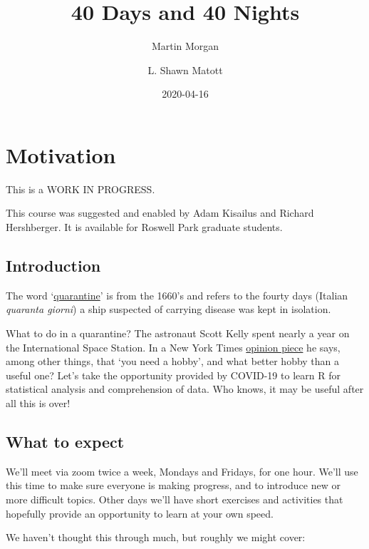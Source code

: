 \documentclass[
]{book}
\title{40 Days and 40 Nights}
\author{Martin Morgan \and L. Shawn Matott}
\date{2020-04-16}
\begin{document}
\maketitle

{
\setcounter{tocdepth}{1}
\tableofcontents
}
\hypertarget{motivation}{%
\chapter*{Motivation}\label{motivation}}

This is a WORK IN PROGRESS.

This course was suggested and enabled by Adam Kisailus and Richard Hershberger. It is available for Roswell Park graduate students.

\hypertarget{introduction}{%
\section*{Introduction}\label{introduction}}

The word `\href{https://www.etymonline.com/word/quarantine}{quarantine}' is from the 1660's and refers to the fourty days (Italian \emph{quaranta giorni}) a ship suspected of carrying disease was kept in isolation.

What to do in a quarantine? The astronaut Scott Kelly spent nearly a year on the International Space Station. In a New York Times \href{https://www.nytimes.com/2020/03/21/opinion/scott-kelly-coronavirus-isolation.html}{opinion piece} he says, among other things, that `you need a hobby', and what better hobby than a useful one? Let's take the opportunity provided by COVID-19 to learn R for statistical analysis and comprehension of data. Who knows, it may be useful after all this is over!

\hypertarget{what-to-expect}{%
\section*{What to expect}\label{what-to-expect}}

We'll meet via zoom twice a week, Mondays and Fridays, for one hour. We'll use this time to make sure everyone is making progress, and to introduce new or more difficult topics. Other days we'll have short exercises and activities that hopefully provide an opportunity to learn at your own speed.

We haven't thought this through much, but roughly we might cover:
\end{document}
